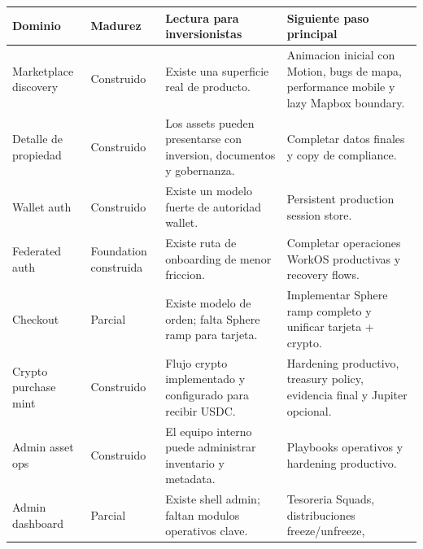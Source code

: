 \documentclass[
  10pt,
  letterpaper,
]{article}
\newcounter{none} %
\begin{document}
{\def\LTcaptype{none} %
\begin{longtable}[]{@{}
  >{\raggedright\arraybackslash}p{}
  >{\raggedright\arraybackslash}p{}
  >{\raggedright\arraybackslash}p{}
  >{\raggedright\arraybackslash}p{}@{}}
\toprule\noalign{}
\begin{minipage}[b]{\linewidth}\raggedright
Dominio
\end{minipage} & \begin{minipage}[b]{\linewidth}\raggedright
Madurez
\end{minipage} & \begin{minipage}[b]{\linewidth}\raggedright
Lectura para inversionistas
\end{minipage} & \begin{minipage}[b]{\linewidth}\raggedright
Siguiente paso principal
\end{minipage} \\
\midrule\noalign{}
\endhead
\bottomrule\noalign{}
\endlastfoot
Marketplace discovery & Construido & Existe una superficie real de
producto. & Animacion inicial con Motion, bugs de mapa, performance
mobile y lazy Mapbox boundary. \\
Detalle de propiedad & Construido & Los assets pueden presentarse con
inversion, documentos y gobernanza. & Completar datos finales y copy de
compliance. \\
Wallet auth & Construido & Existe un modelo fuerte de autoridad wallet.
& Persistent production session store. \\
Federated auth & Foundation construida & Existe ruta de onboarding de
menor friccion. & Completar operaciones WorkOS productivas y recovery
flows. \\
Checkout & Parcial & Existe modelo de orden; falta Sphere ramp para
tarjeta. & Implementar Sphere ramp completo y unificar tarjeta +
crypto. \\
Crypto purchase mint & Construido & Flujo crypto implementado y
configurado para recibir USDC. & Hardening productivo, treasury policy,
evidencia final y Jupiter opcional. \\
Admin asset ops & Construido & El equipo interno puede administrar
inventario y metadata. & Playbooks operativos y hardening productivo. \\
Admin dashboard & Parcial & Existe shell admin; faltan modulos
operativos clave. & Tesoreria Squads, distribuciones freeze/unfreeze,

\end{longtable}}
\end{document}
